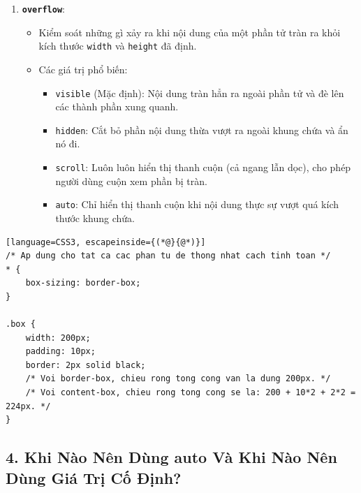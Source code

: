 \documentclass[11pt,oneside]{book}
\newcommand{\codeinline}[1]{\textcolor{accentOrange}{\texttt{#1}}}
\begin{document}
\begin{enumerate}[leftmargin=1.5em, itemsep=6pt, parsep=0pt]
    \item \textbf{\codeinline{overflow}}:
    \begin{itemize}[leftmargin=1.2em, itemsep=2pt, parsep=0pt]
        \item Kiểm soát những gì xảy ra khi nội dung của một phần tử tràn ra khỏi kích thước \codeinline{width} và \codeinline{height} đã định.
        \item Các giá trị phổ biến:
        \begin{itemize}[leftmargin=1.2em, itemsep=2pt, parsep=0pt]
            \item \codeinline{visible} (Mặc định): Nội dung tràn hẳn ra ngoài phần tử và đè lên các thành phần xung quanh.
            \item \codeinline{hidden}: Cắt bỏ phần nội dung thừa vượt ra ngoài khung chứa và ẩn nó đi.
            \item \codeinline{scroll}: Luôn luôn hiển thị thanh cuộn (cả ngang lẫn dọc), cho phép người dùng cuộn xem phần bị tràn.
            \item \codeinline{auto}: Chỉ hiển thị thanh cuộn khi nội dung thực sự vượt quá kích thước khung chứa.
        \end{itemize}
    \end{itemize}
\end{enumerate}

\begin{codeWindow}
\begin{lstlisting}[language=CSS3, escapeinside={(*@}{@*)}]
/* Ap dung cho tat ca cac phan tu de thong nhat cach tinh toan */
* {
    box-sizing: border-box;
}

.box {
    width: 200px;
    padding: 10px;
    border: 2px solid black;
    /* Voi border-box, chieu rong tong cong van la dung 200px. */
    /* Voi content-box, chieu rong tong cong se la: 200 + 10*2 + 2*2 = 224px. */
}
\end{lstlisting}
\end{codeWindow}

\subsection{4. Khi Nào Nên Dùng auto Và Khi Nào Nên Dùng Giá Trị Cố Định?}
\label{subsec:when_to_use_auto_vs_fixed}
\end{document}
